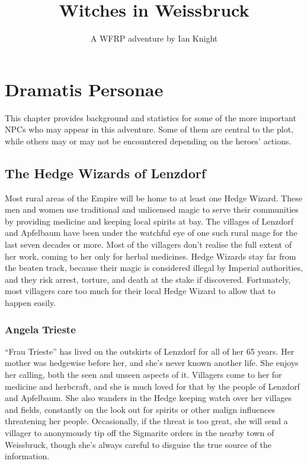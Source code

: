 \documentclass{wfrp}
\begin{document}
\title{Witches in Weissbruck}
\author{A WFRP adventure by Ian Knight}
\date{}
\maketitle

\tableofcontents

\chapter{Dramatis Personae}
This chapter provides background and statistics for some of the more important
NPCs who may appear in this adventure. Some of them are central to the plot,
while others may or may not be encountered depending on the heroes' actions.

\section{The Hedge Wizards of Lenzdorf}
Most rural areas of the Empire will be home to at least one Hedge Wizard. These
men and women use traditional and unlicensed magic to serve their communities
by providing medicine and keeping local spirits at bay. The villages of Lenzdorf
and Apfelbaum have been under the watchful eye of one such rural mage for
the last seven decades or more. Most of the villagers don't realise the full
extent of her work, coming to her only for herbal medicines. Hedge Wizards stay
far from the beaten track, because their magic is considered illegal by Imperial
authorities, and they risk arrest, torture, and death at the stake if
discovered. Fortunately, most villagers care too much for their local Hedge
Wizard to allow that to happen easily.

\subsection{Angela Trieste}
``Frau Trieste'' has lived on the outskirts of Lenzdorf for all of her 65 years.
Her mother was hedgewise before her, and she's never known another life. She
enjoys her calling, both the seen and unseen aspects of it. Villagers come to
her for medicine and herbcraft, and she is much loved for that by the people of
Lenzdorf and Apfelbaum. She also wanders in the Hedge keeping watch over her
villages and fields, constantly on the look out for spirits or other malign
influences threatening her people. Occasionally, if the threat is too great,
she will send a villager to anonymously tip off the Sigmarite orders in the
nearby town of Weissbruck, though she's always careful to disguise the true
source of the information.
\end{document}
